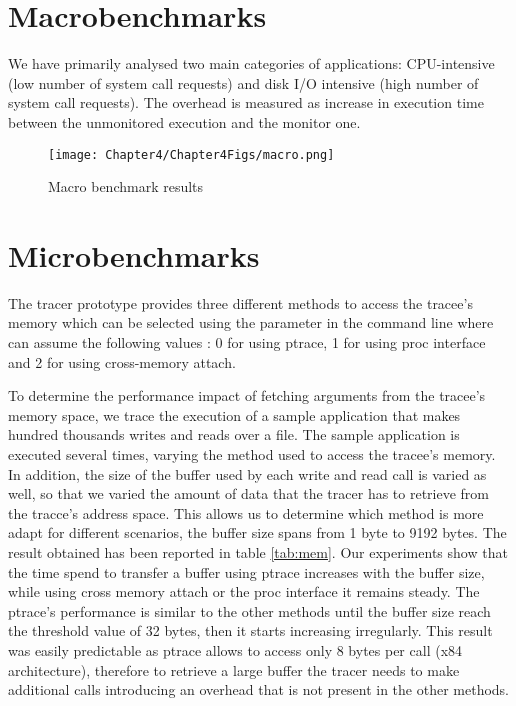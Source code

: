 \newpage
\section{Macrobenchmarks}
\label{macro}
We have primarily analysed two main categories of applications: 
	  CPU-intensive (low number of system call requests) and disk I/O  intensive (high number of system call requests).
	  The overhead is measured as increase in execution time between the unmonitored execution and the monitor one. 
	  
\begin{figure}
\centering
\texttt{[image: Chapter4/Chapter4Figs/macro.png]} 
\caption{Macro benchmark results}
\label{fig:macro}
\end{figure}

\newpage
\section{Microbenchmarks}
\label{micro}
The tracer prototype provides three different methods to access the tracee's memory which can be selected using the  parameter in the command line where  can assume the following values : 0 for using ptrace, 1 for using proc interface and 2 for using cross-memory attach.  

To determine the performance impact of fetching arguments from the tracee's memory space, we trace the execution of a sample application that makes hundred thousands writes and reads over a file. The sample application is executed several times, varying the method used to access the tracee's memory. In addition, the size of the buffer used by each write and read call is varied as well, so that we varied the amount of data that the tracer has to retrieve from the tracce's address space. This allows us to determine which method is more adapt for different scenarios, the buffer size spans from 1 byte to 9192 bytes. The result obtained has been reported in table \ref{tab:mem}. Our experiments show that the time spend to transfer a buffer using ptrace increases with the buffer size, while using cross memory attach or the proc interface it remains steady. The ptrace's performance is similar to the other methods until the buffer size reach the threshold value of 32 bytes, then it starts increasing irregularly. This result was easily predictable as ptrace allows to access only 8 bytes per call (x84 architecture), therefore to retrieve a large buffer the tracer needs to make additional calls introducing an overhead that is not present in the other methods.  

